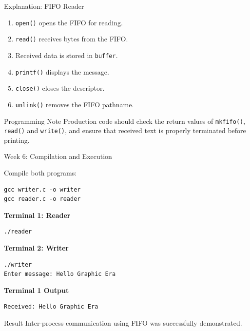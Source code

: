 \documentclass[aspectratio=169,10pt]{beamer}
\begin{document}
\begin{frame}{Explanation: FIFO Reader}

\begin{enumerate}
    \item \texttt{open()} opens the FIFO for reading.
    \item \texttt{read()} receives bytes from the FIFO.
    \item Received data is stored in \texttt{buffer}.
    \item \texttt{printf()} displays the message.
    \item \texttt{close()} closes the descriptor.
    \item \texttt{unlink()} removes the FIFO pathname.
\end{enumerate}

\begin{block}{Programming Note}
Production code should check the return values
of \texttt{mkfifo()}, \texttt{read()} and
\texttt{write()}, and ensure that received text
is properly terminated before printing.
\end{block}

\end{frame}

\begin{frame}[fragile]{Week 6: Compilation and Execution}

Compile both programs:

\begin{lstlisting}[style=terminal]
gcc writer.c -o writer
gcc reader.c -o reader
\end{lstlisting}

\textbf{Terminal 1: Reader}

\begin{lstlisting}[style=terminal]
./reader
\end{lstlisting}

\textbf{Terminal 2: Writer}

\begin{lstlisting}[style=terminal]
./writer
Enter message: Hello Graphic Era
\end{lstlisting}

\textbf{Terminal 1 Output}

\begin{lstlisting}[style=terminal]
Received: Hello Graphic Era
\end{lstlisting}

\begin{block}{Result}
Inter-process communication using FIFO
was successfully demonstrated.
\end{block}

\end{frame}
\end{document}
